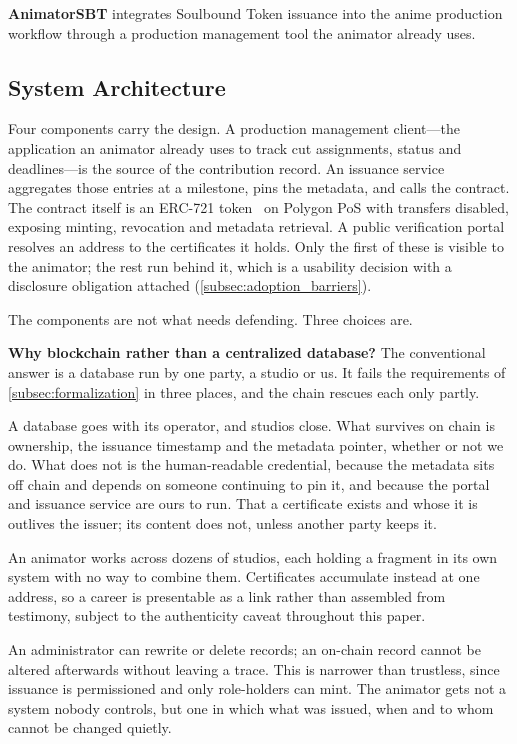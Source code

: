 
\textbf{AnimatorSBT} integrates Soulbound Token issuance into the anime production
workflow through a production management tool the animator already uses.
\subsection{System Architecture}
\label{subsec:architecture}

Four components carry the design. A production management client---the
application an animator already uses to track cut assignments, status and
deadlines---is the source of the contribution record. An issuance service
aggregates those entries at a milestone, pins the metadata, and calls the
contract. The contract itself is an ERC-721 token~\cite{entriken2018erc721} on
Polygon PoS with transfers disabled, exposing minting, revocation and metadata
retrieval. A public verification portal resolves an address to the certificates it
holds. Only the first of these is visible to the animator; the rest run behind it,
which is a usability decision with a disclosure obligation attached
(\cref{subsec:adoption_barriers}).

The components are not what needs defending. Three choices are.

\textbf{Why blockchain rather than a centralized database?}
The conventional answer is a database run by one party, a studio or us. It fails the
requirements of \cref{subsec:formalization} in three places, and the chain rescues
each only partly.

A database goes with its operator, and studios close. What survives on chain is
ownership, the issuance timestamp and the metadata pointer, whether or not we do. What
does not is the human-readable credential, because the metadata sits off chain and
depends on someone continuing to pin it, and because the portal and issuance service
are ours to run. That a certificate exists and whose it is outlives the issuer; its
content does not, unless another party keeps it.

An animator works across dozens of studios, each holding a fragment in its own system
with no way to combine them. Certificates accumulate instead at one address, so a
career is presentable as a link rather than assembled from testimony, subject to the
authenticity caveat throughout this paper.

An administrator can rewrite or delete records; an on-chain record cannot be altered
afterwards without leaving a trace. This is narrower than trustless, since issuance is
permissioned and only role-holders can mint. The animator gets not a system nobody
controls, but one in which what was issued, when and to whom cannot be changed
quietly.

